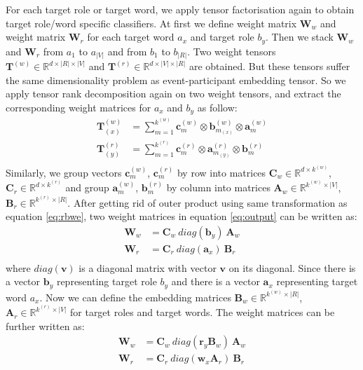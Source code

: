 \documentclass[a4paper]{article}
\begin{document}
For each target role or target word, we apply tensor factorisation again to obtain target role/word specific classifiers. At first we define weight matrix $\mathbf{W}_w$ and weight matrix $\mathbf{W}_r$ for each target word $a_x$ and target role $b_y$. Then we stack $\mathbf{W}_w$ and $\mathbf{W}_r$ from $a_1$ to $a_{|V|}$ and from $b_1$ to $b_{|R|}$. Two weight tensors $\mathbf{T}^{(w)} \in \mathbb{R}^{d \times |R| \times |V|}$ and $\mathbf{T}^{(r)} \in \mathbb{R}^{d \times |V| \times |R|}$ are obtained. But these tensors suffer the same dimensionality problem as event-participant embedding tensor. So we apply tensor rank decomposition again on two weight tensors, and extract the corresponding weight matrices for $a_x$ and $b_y$ as follow: 
\begin{equation} \label{eq:trd_mt_cls}
\begin{aligned}
    \mathbf{T}_{(x)}^{(w)}
        &= \sum_{m=1}^{k^{(w)}} \mathbf{c}_{m}^{(w)} \otimes \mathbf{b}_{m_{(x)}}^{(w)} \otimes \mathbf{a}_m^{(w)} \\
    \mathbf{T}_{(y)}^{(r)}
        &= \sum_{m=1}^{k^{(r)}} \mathbf{c}_{m}^{(r)} \otimes  \mathbf{a}_{m_{(y)}}^{(r)} \otimes \mathbf{b}_m^{(r)} \\
\end{aligned}
\end{equation}
Similarly, we group vectors $\mathbf{c}_{m}^{(w)}$, $\mathbf{c}_{m}^{(r)}$ by row into matrices $\mathbf{C}_w \in \mathbb{R}^{d \times k^{(w)}}$, $\mathbf{C}_r \in \mathbb{R}^{d \times k^{(r)}}$ and group $\mathbf{a}_m^{(w)}$, $\mathbf{b}_m^{(r)}$ by column into matrices $\mathbf{A}_w \in \mathbb{R}^{k^{(w)} \times |V|}$, $\mathbf{B}_r \in \mathbb{R}^{k^{(r)} \times |R|}$. After getting rid of outer product using same transformation as equation \eqref{eq:rbwe}, two weight matrices in equation \eqref{eq:output}  can be written as: 
\begin{equation} \label{eq:cls_mt}
\begin{aligned}
    \mathbf{W}_w
        &= \mathbf{C}_w \ diag(\mathbf{b}_y) \ \mathbf{A}_w \\
    \mathbf{W}_r
        &= \mathbf{C}_r \ diag(\mathbf{a}_x) \ \mathbf{B}_r \\
\end{aligned}
\end{equation}
where $diag(\mathbf{v})$ is a diagonal matrix with vector $\mathbf{v}$ on its diagonal. Since there is a vector $\mathbf{b}_y$ representing target role $b_y$ and there is a vector $\mathbf{a}_x$ representing target word $a_x$. Now we can define the embedding matrices $\mathbf{B}_w \in \mathbb{R}^{k^{(w)} \times |R|}$, $\mathbf{A}_r \in \mathbb{R}^{k^{(r)} \times |V|}$ for target roles and target words. The weight matrices can be further written as: 
\begin{equation} \label{eq:cls_mt_temb}
\begin{aligned}
    \mathbf{W}_w
        &= \mathbf{C}_w \ diag(\mathbf{r}_y \mathbf{B}_w) \ \mathbf{A}_w \\
    \mathbf{W}_r
        &= \mathbf{C}_r \ diag(\mathbf{w}_x \mathbf{A}_r) \ \mathbf{B}_r \\
\end{aligned}
\end{equation}
\end{document}
